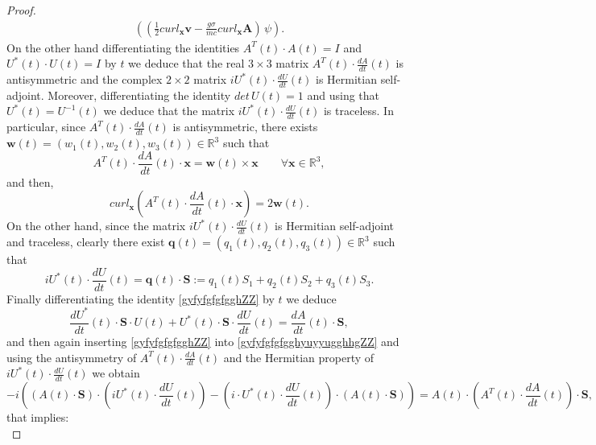 \documentclass{article}
\theoremstyle{definition}
\theoremstyle{remark}
\renewcommand{\vec}[1]{\mathbf{#1}}
\newcommand{\er}{\eqref}
\newcommand{\er}{\eqref}
\begin{document}
\begin{proof}
\begin{multline}
\left(\left(\frac{1}{2}curl_{\vec x}\vec
v-\frac{g\sigma}{mc}curl_{\vec x}\vec A\right)\,\psi\right).
\end{multline}
On the other hand differentiating the identities $A^T(t)\cdot
A(t)=I$ and $U^*(t)\cdot U(t)=I$ by $t$ we deduce that the real
$3\times 3$ matrix $A^T(t)\cdot\frac{dA}{dt}(t)$ is antisymmetric
and the complex $2\times 2$ matrix $iU^*(t)\cdot\frac{dU}{dt}(t)$ is
Hermitian self-adjoint. Moreover, differentiating the identity
$det\,U(t)=1$ and using that $U^*(t)=U^{-1}(t)$ we deduce that the
matrix $iU^*(t)\cdot\frac{dU}{dt}(t)$ is traceless. In particular,
since $A^T(t)\cdot\frac{dA}{dt}(t)$ is antisymmetric, there exists
$\vec w(t)=(w_1(t),w_2(t),w_3(t))\in\mathbb{R}^3$ such that
\begin{equation}\label{gyfyfgfgfgghuyyuyyuZZ}
A^T(t)\cdot\frac{dA}{dt}(t)\cdot \vec x=\vec w(t)\times\vec
x\quad\quad\forall\vec x\in\mathbb{R}^3,
\end{equation}
and then,
\begin{equation}\label{gyfyfgfgfgghuyyuyyuuyhjjhZZ}
curl_{\vec x}\left(A^T(t)\cdot\frac{dA}{dt}(t)\cdot \vec
x\right)=2\vec w(t).
\end{equation}
On the other hand, since the matrix $iU^*(t)\cdot\frac{dU}{dt}(t)$
is Hermitian self-adjoint and traceless, clearly there exist $\vec
q(t)=(q_1(t),q_2(t),q_3(t))\in\mathbb{R}^3$ such that
\begin{equation}\label{gyfyfgfgfgghuyyuyyuuyhjjhgfhhjghZZ}
iU^*(t)\cdot\frac{dU}{dt}(t)=\vec q(t)\cdot\vec
S:=q_1(t)S_1+q_2(t)S_2+q_3(t)S_3.
\end{equation}
Finally differentiating the identity \er{gyfyfgfgfgghZZ} by $t$ we
deduce
\begin{equation}\label{gyfyfgfgfgghyuyyugghhgZZ}
\frac{dU^*}{dt}(t)\cdot\vec S\cdot U(t)+U^*(t)\cdot\vec S\cdot
\frac{dU}{dt}(t)=\frac{dA}{dt}(t)\cdot\vec S,
\end{equation}
and then again inserting \er{gyfyfgfgfgghZZ} into
\er{gyfyfgfgfgghyuyyugghhgZZ} and using the antisymmetry of
$A^T(t)\cdot\frac{dA}{dt}(t)$ and the Hermitian property of
$iU^*(t)\cdot\frac{dU}{dt}(t)$ we obtain
\begin{equation}\label{gyfyfgfgfgghyuyyugghhgghghhhjZZ}
-i\left(\left(A(t)\cdot\vec S\right)\cdot \left(iU^*(t)\cdot
\frac{dU}{dt}(t)\right)-\left(i\cdot
U^*(t)\cdot\frac{dU}{dt}(t)\right)\cdot \left(A(t)\cdot\vec
S\right)\right)=A(t)\cdot\left(A^T(t)\cdot\frac{dA}{dt}(t)\right)\cdot\vec
S,
\end{equation}
that implies:
\begin{equation}\label{gyfyfgfgfgghyuyyugghhgghghhhjuytytytyZZ}

\end{equation}
\end{proof}
\end{document}
